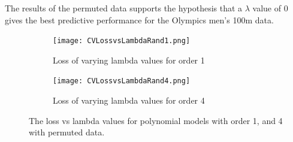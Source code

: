 The results of the permuted data supports the hypothesis that a $\lambda$ value of 0 gives the best predictive performance for the Olympics men's 100m data.

\begin{figure}[h] %
	\centering
	\begin{subfigure}[b]{0.45\textwidth}
		\texttt{[image: CVLossvsLambdaRand1.png]}
		\caption{Loss of varying lambda values for order 1}
		\label{fig:CVLL1R}
	\end{subfigure}
	\begin{subfigure}[b]{0.45\textwidth}
		\texttt{[image: CVLossvsLambdaRand4.png]}
		\caption{Loss of varying lambda values for order 4}
		\label{fig:CVLL4R}
	\end{subfigure}
	\caption{The loss vs lambda values for polynomial models with order 1, and 4 with permuted data.}
	\label{fig:LambdaLossR}
\end{figure}
